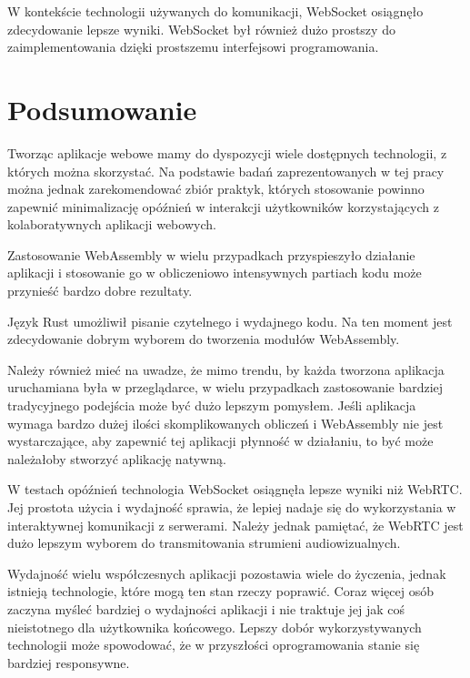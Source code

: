 \documentclass[language=polish,type=master]{aghmodern}
\begin{document}
W kontekście technologii używanych do komunikacji, WebSocket osiągnęło zdecydowanie lepsze wyniki.
WebSocket był również dużo prostszy do zaimplementowania dzięki prostszemu interfejsowi programowania.

\chapter{Podsumowanie}
Tworząc aplikacje webowe mamy do dyspozycji wiele dostępnych technologii, z których można skorzystać.
Na podstawie badań zaprezentowanych w tej pracy można jednak zarekomendować zbiór praktyk, których stosowanie powinno zapewnić minimalizację opóźnień w interakcji użytkowników korzystających z kolaboratywnych aplikacji webowych.

Zastosowanie WebAssembly w wielu przypadkach przyspieszyło działanie aplikacji i stosowanie go w obliczeniowo intensywnych partiach kodu może przynieść bardzo dobre rezultaty.

Język Rust umożliwił pisanie czytelnego i wydajnego kodu.
Na ten moment jest zdecydowanie dobrym wyborem do tworzenia modułów WebAssembly.

Należy również mieć na uwadze, że mimo trendu, by każda tworzona aplikacja uruchamiana była w przeglądarce, w wielu przypadkach zastosowanie bardziej tradycyjnego podejścia może być dużo lepszym pomysłem.
Jeśli aplikacja wymaga bardzo dużej ilości skomplikowanych obliczeń i WebAssembly nie jest wystarczające, aby zapewnić tej aplikacji płynność w działaniu, to być może należałoby stworzyć aplikację natywną.

W testach opóźnień technologia WebSocket osiągnęła lepsze wyniki niż WebRTC.
Jej prostota użycia i wydajność sprawia, że lepiej nadaje się do wykorzystania w interaktywnej komunikacji z serwerami.
Należy jednak pamiętać, że WebRTC jest dużo lepszym wyborem do transmitowania strumieni audiowizualnych.

Wydajność wielu współczesnych aplikacji pozostawia wiele do życzenia, jednak istnieją technologie, które mogą ten stan rzeczy poprawić.
Coraz więcej osób zaczyna myśleć bardziej o wydajności aplikacji i nie traktuje jej jak coś nieistotnego dla użytkownika końcowego.
Lepszy dobór wykorzystywanych technologii może spowodować, że w przyszłości oprogramowania stanie się bardziej responsywne.


\backmatter

\cleardoublepage
\renewcommand\listoflistingscaption{Spis listingów}
\listoflistings

\cleardoublepage
\listoffigures

\cleardoublepage
\printbibliography
\end{document}
